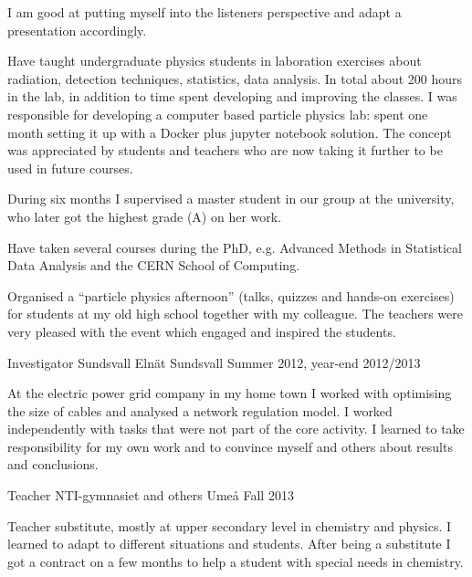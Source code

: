 \begin{cventries}
{\begin{cvitems}
{	I am good at putting myself into the listeners perspective and adapt a presentation accordingly.
}
\item {Have taught undergraduate physics students in laboration exercises about radiation, detection techniques, statistics, data analysis. 
       In total about 200 hours in the lab, in addition to time spent developing and improving the classes.
       I was responsible for developing a computer based particle physics lab: spent one month setting it up with a Docker plus jupyter notebook solution.
       The concept was appreciated by students and teachers who are now taking it further to be used in future courses.
}
\item {During six months I supervised a master student in our group at the university, who later got the highest grade (A) on her work.
}
\item {Have taken several courses during the PhD, e.g. Advanced Methods in Statistical Data Analysis and the CERN School of Computing.
}
\item {Organised a ``particle physics afternoon'' (talks, quizzes and hands-on exercises) for students at my old high school together with my colleague.
         The teachers were very pleased with the event which engaged and inspired the students.
}
\end{cvitems}
}



\cventry
{Investigator} %
{Sundsvall Eln\"{a}t} %
{Sundsvall} %
{Summer 2012, year-end 2012/2013} %
{ %
\begin{cvitems}
\item {At the electric power grid company in my home town I worked with optimising the size of cables and analysed a network regulation model. 
		 I worked independently with tasks that were not part of the core activity. 
		 I learned to take responsibility for my own work and to convince myself and others about results and conclusions. 
}
\end{cvitems}
}


\cventry
{Teacher} %
{NTI-gymnasiet and others} %
{Ume{\aa}} %
{Fall 2013} %
{ %
\begin{cvitems}
\item {Teacher substitute, mostly at upper secondary level in chemistry and physics. 
		I learned to adapt to different situations and students. 
		After being a substitute I got a contract on a few months to help a student with special needs in chemistry.
		 }
\end{cvitems}
}


\end{cventries}
